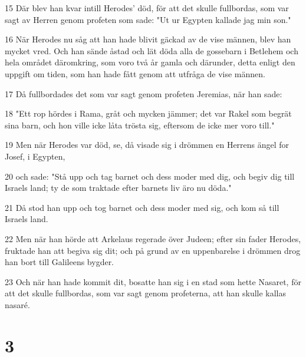 \par 15 Där blev han kvar intill Herodes' död, för att det skulle fullbordas, som var sagt av Herren genom profeten som sade: "Ut ur Egypten kallade jag min son."
\par 16 När Herodes nu såg att han hade blivit gäckad av de vise männen, blev han mycket vred. Och han sände åstad och lät döda alla de gossebarn i Betlehem och hela området däromkring, som voro två år gamla och därunder, detta enligt den uppgift om tiden, som han hade fått genom att utfråga de vise männen.
\par 17 Då fullbordades det som var sagt genom profeten Jeremias, när han sade:
\par 18 "Ett rop hördes i Rama, gråt och mycken jämmer; det var Rakel som begrät sina barn, och hon ville icke låta trösta sig, eftersom de icke mer voro till."
\par 19 Men när Herodes var död, se, då visade sig i drömmen en Herrens ängel for Josef, i Egypten,
\par 20 och sade: "Stå upp och tag barnet och dess moder med dig, och begiv dig till Israels land; ty de som traktade efter barnets liv äro nu döda."
\par 21 Då stod han upp och tog barnet och dess moder med sig, och kom så till Israels land.
\par 22 Men när han hörde att Arkelaus regerade över Judeen; efter sin fader Herodes, fruktade han att begiva sig dit; och på grund av en uppenbarelse i drömmen drog han bort till Galileens bygder.
\par 23 Och när han hade kommit dit, bosatte han sig i en stad som hette Nasaret, för att det skulle fullbordas, som var sagt genom profeterna, att han skulle kallas nasaré.

\chapter{3}

